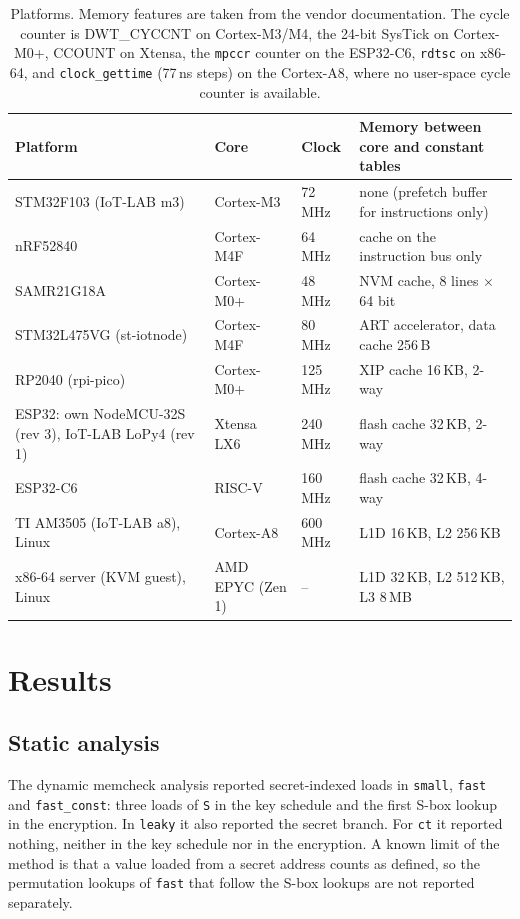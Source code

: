 \documentclass[11pt, a4paper, twoside, reqno]{article}
\newcommand{\tsm}{\texttt{small}}
\newcommand{\tfa}{\texttt{fast}}
\newcommand{\tfc}{\texttt{fast\_const}}
\newcommand{\tct}{\texttt{ct}}
\newcommand{\tlk}{\texttt{leaky}}
\begin{document}
\begin{table}[!htbp]
\centering
\caption{Platforms. Memory features are taken from the vendor documentation. The cycle counter is DWT\_CYCCNT on Cortex-M3/M4, the 24-bit SysTick on Cortex-M0+, CCOUNT on Xtensa, the \texttt{mpccr} counter on the ESP32-C6, \texttt{rdtsc} on x86-64, and \texttt{clock\_gettime} (77\,ns steps) on the Cortex-A8, where no user-space cycle counter is available.}
\label{tab:platforms}
\small
\begin{tabular}{p{4.1cm}p{2.3cm}lp{5.4cm}}
\hline
Platform & Core & Clock & Memory between core and constant tables\\
\hline
STM32F103 (IoT-LAB m3) & Cortex-M3 & 72\,MHz & none (prefetch buffer for instructions only) \citep{rm0008}\\
nRF52840 & Cortex-M4F & 64\,MHz & cache on the instruction bus only \citep{nrf52840}\\
SAMR21G18A & Cortex-M0+ & 48\,MHz & NVM cache, 8 lines $\times$ 64 bit \citep{samr21}\\
STM32L475VG (st-iotnode) & Cortex-M4F & 80\,MHz & ART accelerator, data cache 256\,B \citep{rm0351}\\
RP2040 (rpi-pico) & Cortex-M0+ & 125\,MHz & XIP cache 16\,KB, 2-way \citep{rp2040}\\
ESP32: own NodeMCU-32S (rev 3), IoT-LAB LoPy4 (rev 1) & Xtensa LX6 & 240\,MHz & flash cache 32\,KB, 2-way \citep{esp32trm}\\
ESP32-C6 & RISC-V & 160\,MHz & flash cache 32\,KB, 4-way \citep{esp32c6trm}\\
TI AM3505 (IoT-LAB a8), Linux & Cortex-A8 & 600\,MHz & L1D 16\,KB, L2 256\,KB \citep{am3505}\\
x86-64 server (KVM guest), Linux & AMD EPYC (Zen 1) & -- & L1D 32\,KB, L2 512\,KB, L3 8\,MB\\
\hline
\end{tabular}
\end{table}

\section{Results}

\subsection{Static analysis}

The dynamic memcheck analysis reported secret-indexed loads in \tsm{}, \tfa{} and \tfc{}: three loads of \texttt{S} in the key schedule and the first S-box lookup in the encryption. In \tlk{} it also reported the secret branch. For \tct{} it reported nothing, neither in the key schedule nor in the encryption. A known limit of the method is that a value loaded from a secret address counts as defined, so the permutation lookups of \tfa{} that follow the S-box lookups are not reported separately.
\end{document}

